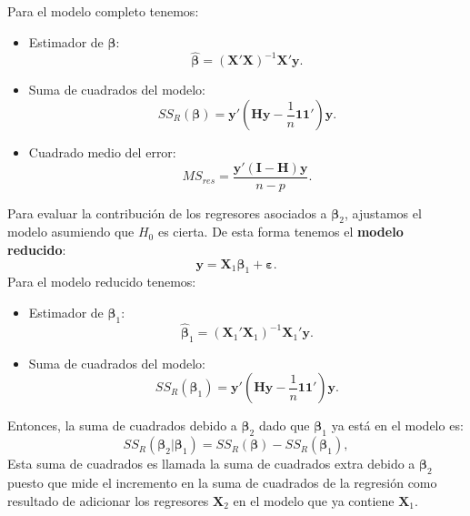 \documentclass[
]{article}
\providecommand{\tightlist}{%
  \setlength{\itemsep}{0pt}\setlength{\parskip}{0pt}}
\begin{document}
Para el modelo completo tenemos:

\begin{itemize}
\tightlist
\item
  Estimador de \(\boldsymbol \beta\):
  \[
  \widehat{\boldsymbol \beta}= (\boldsymbol X'\boldsymbol X)^{-1}\boldsymbol X'\boldsymbol y.
  \]
\item
  Suma de cuadrados del modelo:
  \[
  SS_{R}(\boldsymbol \beta) = \boldsymbol y'(\boldsymbol H\boldsymbol y- \frac{1}{n}\boldsymbol 1\boldsymbol 1')\boldsymbol y.
  \]
\item
  Cuadrado medio del error:
  \[
  MS_{res} = \frac{\boldsymbol y'(\boldsymbol I- \boldsymbol H)\boldsymbol y}{n-p}.
  \]
\end{itemize}

Para evaluar la contribución de los regresores asociados a \(\boldsymbol \beta_{2}\), ajustamos el modelo asumiendo que \(H_{0}\) es cierta. De esta forma tenemos el \textbf{modelo reducido}:
\[
\boldsymbol y= \boldsymbol X_{1}\boldsymbol \beta_{1} + \boldsymbol \varepsilon.
\]
Para el modelo reducido tenemos:

\begin{itemize}
\tightlist
\item
  Estimador de \(\boldsymbol \beta_{1}\):
  \[
  \widehat{\boldsymbol \beta}_{1} = (\boldsymbol X_{1}'\boldsymbol X_{1})^{-1}\boldsymbol X_{1}'\boldsymbol y.
  \]
\item
  Suma de cuadrados del modelo:
  \[
  SS_{R}(\boldsymbol \beta_{1}) = \boldsymbol y'(\boldsymbol H\boldsymbol y- \frac{1}{n}\boldsymbol 1\boldsymbol 1')\boldsymbol y.
  \]
\end{itemize}

Entonces, la suma de cuadrados debido a \(\boldsymbol \beta_{2}\) dado que \(\boldsymbol \beta_{1}\) ya está en el modelo es:
\[
SS_{R}(\boldsymbol \beta_{2}| \boldsymbol \beta_{1}) = SS_{R}(\boldsymbol \beta) - SS_{R}(\boldsymbol \beta_{1}),
\]
Esta suma de cuadrados es llamada la suma de cuadrados extra debido a \(\boldsymbol \beta_2\) puesto que mide el incremento en la suma de cuadrados de la regresión como resultado de adicionar los regresores \(\boldsymbol X_{2}\) en el modelo que ya contiene \(\boldsymbol X_{1}\).
\end{document}
